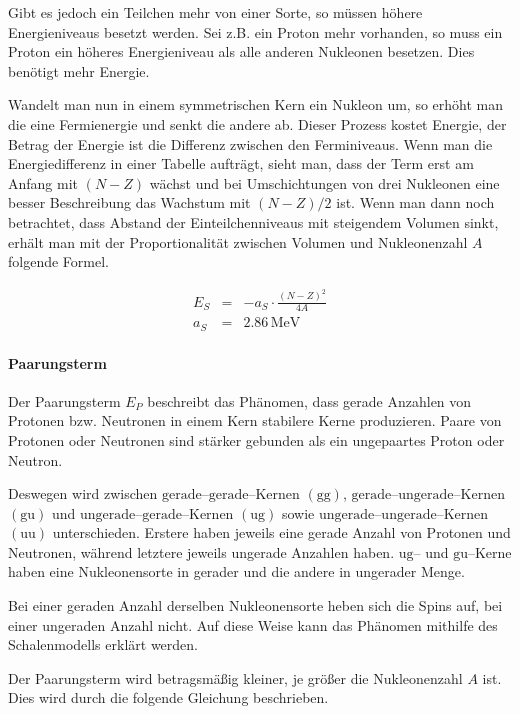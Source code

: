 \documentclass[12pt,a4paper]{scrartcl}
\numberwithin{equation}{section} %
\begin{document}
Gibt es jedoch ein Teilchen mehr von einer Sorte, so müssen höhere Energieniveaus besetzt werden. Sei z.B. ein Proton mehr vorhanden, so muss ein Proton ein höheres Energieniveau als alle anderen Nukleonen besetzen. Dies benötigt mehr Energie.

Wandelt man nun in einem symmetrischen Kern ein Nukleon um, so erhöht man die eine Fermienergie und senkt die andere ab. Dieser Prozess kostet Energie, der Betrag der Energie ist die Differenz zwischen den Ferminiveaus. Wenn man die Energiedifferenz in einer Tabelle aufträgt, sieht man, dass der Term erst am Anfang mit $(N-Z)$ wächst und bei Umschichtungen von drei Nukleonen eine besser Beschreibung das Wachstum mit $(N-Z)/2$ ist. Wenn man dann noch betrachtet, dass Abstand der Einteilchenniveaus mit steigendem Volumen sinkt, erhält man mit der Proportionalität zwischen Volumen und Nukleonenzahl $A$ folgende Formel.

\begin{eqnarray}
	E_S &=& - a_S\cdot \frac{(N-Z)^2}{4A} \label{Symmetrieterm} \\
	a_S &=& 2.86\mathrm{\,MeV}
\end{eqnarray}

\hypertarget{paarungsterm}{%
	\paragraph{Paarungsterm}\label{paarungsterm}}

Der Paarungsterm $E_P$ beschreibt das Phänomen, dass gerade Anzahlen von Protonen bzw. Neutronen in einem Kern stabilere Kerne produzieren. Paare von Protonen oder Neutronen sind stärker gebunden als ein ungepaartes Proton oder Neutron.

Deswegen wird zwischen $\mathrm{gerade}$--$\mathrm{gerade}$--Kernen $(\mathrm{gg})$, $\mathrm{gerade}$--$\mathrm{ungerade}$--Kernen $(\mathrm{gu})$ und $\mathrm{ungerade}$--$\mathrm{gerade}$--Kernen $(\mathrm{ug})$ sowie $\mathrm{ungerade}$--$\mathrm{ungerade}$--Kernen $(\mathrm{uu})$ unterschieden. Erstere haben jeweils eine gerade Anzahl von Protonen und Neutronen, während letztere jeweils ungerade Anzahlen haben. $\mathrm{ug}$-- und $\mathrm{gu}$--Kerne haben eine Nukleonensorte in gerader und die andere in ungerader Menge.

Bei einer geraden Anzahl derselben Nukleonensorte heben sich die Spins auf, bei einer ungeraden Anzahl nicht. Auf diese Weise kann das Phänomen mithilfe des Schalenmodells erklärt werden.

Der Paarungsterm wird betragsmäßig kleiner, je größer die Nukleonenzahl $A$ ist. Dies wird durch die folgende Gleichung beschrieben.
\end{document}
